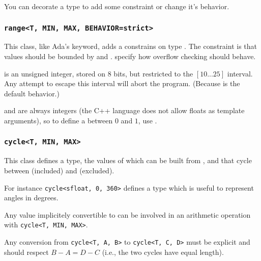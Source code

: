 You can decorate a type to add some constraint or change it's
behavior.

\subsubsection{\lstinline$range<T, MIN, MAX, BEHAVIOR=strict>$}

This class, like Ada's  keyword, adds a constrains on type
.  The constraint is that values should be bounded by
 and .   specify how overflow
checking should behave.


 is an unsigned integer,
stored on 8 bits, but restricted to the $[10...25]$ interval.  Any
attempt to escape this interval will abort the program.  (Because
 is the default behavior.)


 and  are always integers (the C++ language does not
allow floats as template arguments), so to define a 
between $0$ and $1$, use .


\subsubsection{\lstinline$cycle<T, MIN, MAX>$}

This class defines a type, the values of which can be built from
, and that cycle between  (included) and
 (excluded).

For instance \lstinline$cycle<sfloat, 0, 360>$ defines a type which is
useful to represent angles in degrees.

Any value implicitely convertible to  can be involved in an
arithmetic operation with \lstinline$cycle<T, MIN, MAX>$.

Any conversion from \lstinline$cycle<T, A, B>$ to
\lstinline$cycle<T, C, D>$ must be explicit and should
respect $B - A = D - C$ (i.e., the
two cycles have equal length).

